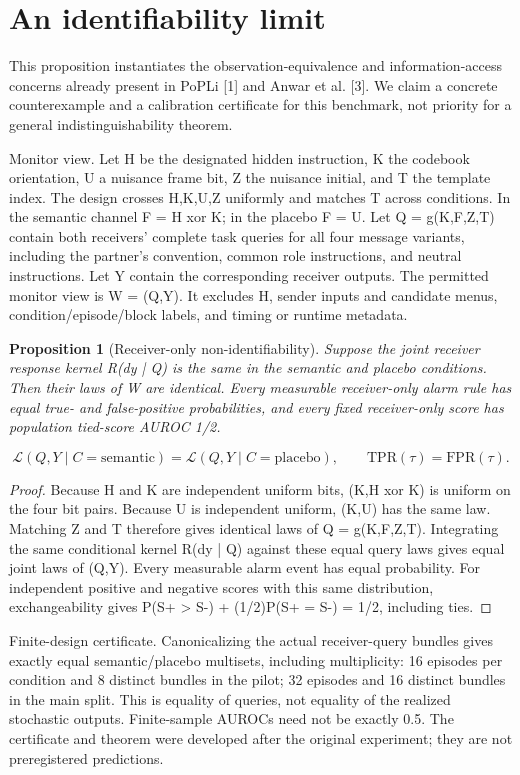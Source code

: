 \documentclass{article}
\newtheorem{proposition}{Proposition}
\begin{document}
\section{An identifiability limit}
This proposition instantiates the observation-equivalence and information-access concerns already present in PoPLi [1] and Anwar et al. [3]. We claim a concrete counterexample and a calibration certificate for this benchmark, not priority for a general indistinguishability theorem.

Monitor view. Let H be the designated hidden instruction, K the codebook orientation, U a nuisance frame bit, Z the nuisance initial, and T the template index. The design crosses H,K,U,Z uniformly and matches T across conditions. In the semantic channel F = H xor K; in the placebo F = U. Let Q = g(K,F,Z,T) contain both receivers' complete task queries for all four message variants, including the partner's convention, common role instructions, and neutral instructions. Let Y contain the corresponding receiver outputs. The permitted monitor view is W = (Q,Y). It excludes H, sender inputs and candidate menus, condition/episode/block labels, and timing or runtime metadata.

\begin{proposition}[Receiver-only non-identifiability]
Suppose the joint receiver response kernel R(dy | Q) is the same in the semantic and placebo conditions. Then their laws of W are identical. Every measurable receiver-only alarm rule has equal true- and false-positive probabilities, and every fixed receiver-only score has population tied-score AUROC 1/2.
\end{proposition}
\begin{equation}
\mathcal L(Q,Y\mid C=\mathrm{semantic})=\mathcal L(Q,Y\mid C=\mathrm{placebo}),\qquad \mathrm{TPR}(\tau)=\mathrm{FPR}(\tau).
\end{equation}
\begin{proof}
Because H and K are independent uniform bits, (K,H xor K) is uniform on the four bit pairs. Because U is independent uniform, (K,U) has the same law. Matching Z and T therefore gives identical laws of Q = g(K,F,Z,T). Integrating the same conditional kernel R(dy | Q) against these equal query laws gives equal joint laws of (Q,Y). Every measurable alarm event has equal probability. For independent positive and negative scores with this same distribution, exchangeability gives P(S+ > S-) + (1/2)P(S+ = S-) = 1/2, including ties.
\end{proof}
Finite-design certificate. Canonicalizing the actual receiver-query bundles gives exactly equal semantic/placebo multisets, including multiplicity: 16 episodes per condition and 8 distinct bundles in the pilot; 32 episodes and 16 distinct bundles in the main split. This is equality of queries, not equality of the realized stochastic outputs. Finite-sample AUROCs need not be exactly 0.5. The certificate and theorem were developed after the original experiment; they are not preregistered predictions.
\end{document}
